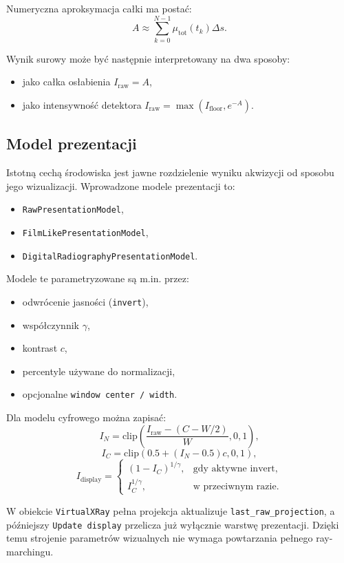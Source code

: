 \documentclass[11pt,a4paper]{article}
\begin{document}
Numeryczna aproksymacja całki ma postać:
\[
  A \approx \sum_{k=0}^{N-1}\mu_{\mathrm{tot}}(t_k)\Delta s.
\]

Wynik surowy może być następnie interpretowany na dwa sposoby:
\begin{itemize}
\item jako całka osłabienia \(I_{\mathrm{raw}}=A\),
\item jako intensywność detektora
      \(I_{\mathrm{raw}}=\max(I_{\mathrm{floor}},e^{-A})\).
\end{itemize}

\subsection{Model prezentacji}

Istotną cechą środowiska jest jawne rozdzielenie wyniku akwizycji od sposobu jego
wizualizacji. Wprowadzone modele prezentacji to:
\begin{itemize}
\item \texttt{RawPresentationModel},
\item \texttt{FilmLikePresentationModel},
\item \texttt{DigitalRadiographyPresentationModel}.
\end{itemize}

Modele te parametryzowane są m.in. przez:
\begin{itemize}
\item odwrócenie jasności (\texttt{invert}),
\item współczynnik \(\gamma\),
\item kontrast \(c\),
\item percentyle używane do normalizacji,
\item opcjonalne \texttt{window center / width}.
\end{itemize}

Dla modelu cyfrowego można zapisać:
\[
  I_N=
  \mathrm{clip}\!\left(
    \frac{I_{\mathrm{raw}}-(C-W/2)}{W},
    0,1
  \right),
\]
\[
  I_C=\mathrm{clip}\!\left(0.5+(I_N-0.5)c,0,1\right),
\]
\[
  I_{\mathrm{display}}=
  \begin{cases}
    (1-I_C)^{1/\gamma}, & \text{gdy aktywne invert},\\
    I_C^{1/\gamma}, & \text{w przeciwnym razie.}
  \end{cases}
\]

W obiekcie \texttt{VirtualXRay} pełna projekcja aktualizuje
\texttt{last\_raw\_projection}, a późniejszy \texttt{Update display} przelicza już
wyłącznie warstwę prezentacji. Dzięki temu strojenie parametrów wizualnych nie wymaga
powtarzania pełnego ray-marchingu.
\end{document}
